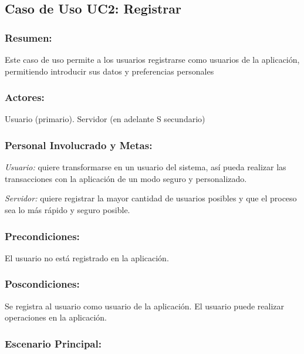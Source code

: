 

\subsection{Caso de Uso UC2: Registrar}

\begin{framed}


\subsubsection{Resumen:} Este caso de uso permite a los usuarios registrarse como usuarios de la aplicación, permitiendo introducir sus datos y preferencias personales


\subsubsection{Actores:} Usuario (primario). Servidor (en adelante S secundario)

\subsubsection{Personal Involucrado y Metas:}

\emph{Usuario:} quiere transformarse en un usuario del sistema, así pueda realizar las transacciones con la aplicación de un modo seguro y personalizado.

\emph{Servidor:} quiere registrar la mayor cantidad de usuarios posibles y que el proceso sea lo más rápido y seguro posible. 

\subsubsection{Precondiciones:} 
El usuario no está registrado en la aplicación. 

\subsubsection{Poscondiciones:} 
Se registra al usuario como usuario de la aplicación. El usuario puede realizar operaciones en la aplicación.

\subsubsection{Escenario Principal: }


\end{framed}
